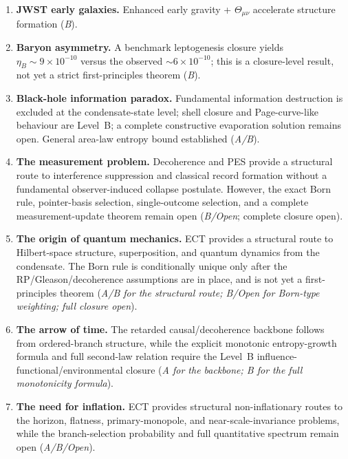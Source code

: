 \documentclass[11pt,a4paper]{article}
\begin{document}
\begin{enumerate}
\item \textbf{JWST early galaxies.} Enhanced early gravity + $\Theta_{\mu\nu}$ accelerate structure formation (\emph{B}).

\item \textbf{Baryon asymmetry.} A benchmark leptogenesis closure yields $\eta_B \sim 9\times10^{-10}$ versus the observed $\sim 6\times10^{-10}$; this is a closure-level result, not yet a strict first-principles theorem (\emph{B}).

\item \textbf{Black-hole information paradox.} Fundamental information destruction is excluded at the condensate-state level; shell closure and Page-curve-like behaviour are Level~B; a complete constructive evaporation solution remains open. General area-law entropy bound established (\emph{A/B}).

\item \textbf{The measurement problem.} Decoherence and PES provide a structural route to interference suppression and classical record formation without a fundamental observer-induced collapse postulate. However, the exact Born rule, pointer-basis selection, single-outcome selection, and a complete measurement-update theorem remain open (\emph{B/Open}; complete closure open).

\item \textbf{The origin of quantum mechanics.} ECT provides a structural route to Hilbert-space structure, superposition, and quantum dynamics from the condensate. The Born rule is conditionally unique only after the RP/Gleason/decoherence assumptions are in place, and is not yet a first-principles theorem (\emph{A/B for the structural route; B/Open for Born-type weighting; full closure open}).

\item \textbf{The arrow of time.} The retarded causal/decoherence backbone follows from ordered-branch structure, while the explicit monotonic entropy-growth formula and full second-law relation require the Level~B influence-functional/environmental closure (\emph{A for the backbone; B for the full monotonicity formula}).

\item \textbf{The need for inflation.} ECT provides structural non-inflationary routes to the horizon, flatness, primary-monopole, and near-scale-invariance problems, while the branch-selection probability and full quantitative spectrum remain open (\emph{A/B/Open}).


\end{enumerate}
\end{document}

